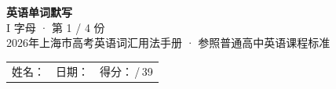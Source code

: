 \documentclass[10pt,a4paper]{article}
\begin{document}
\pagestyle{plain}

\begin{center}
{\LARGE\bfseries 英语单词默写}\\[0.22em]
{\large I 字母 · 第 1 / 4 份}\\[0.18em]
{\small 2026年上海市高考英语词汇用法手册 · 参照普通高中英语课程标准}
\end{center}

\vspace{0.25em}
\noindent\begin{tabular}{@{}p{}@{}p{}@{}p{}@{}}
姓名：\underline{\hspace{2.0cm}} & 日期：\underline{\hspace{2.0cm}} & 得分：\underline{\hspace{1.3cm}}\,/\,39 \\
\end{tabular}

\vspace{0.3em}

\vspace{0.08em}
\end{document}
